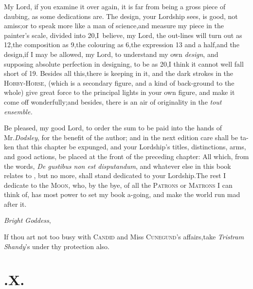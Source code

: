 \documentclass{article}
\begin{document}
My Lord, if you examine it over\break 
again, it is far from being a gross piece\break
of daubing, as some dedications are.\break
The design, your
Lordship sees, is good, 
not amiss;\tsk  or to speak more like a man of
science,\tsk  and measure my piece in the painter’s scale,
divided into 20,\tsk  I~believe, my Lord, the out-lines will turn
out as 12,\tsk  the composition as 9,\tsk  the colouring as
6,\tsk  the expression 13 and a half,\tsk  and the
design,\tsk  if I may be allowed, my Lord, to understand my own
\textit{design}, and supposing absolute perfection in designing, to
be as 20,\tsk  I think it cannot well fall short of 19. Besides
all this,\tsk  there is keeping in it, and the dark strokes in the
\textsc{Hobby-Horse}, (which is a secondary
figure, and a kind of back-ground to the whole) give great force to the
principal lights in your own figure, and make it come off
wonderfully;\tsk  and besides, there is an air of originality in
the \textit{tout ensemble.}

Be pleased, my good Lord, to order the sum to be paid into the
hands of Mr.\break\textit{Dodsley}, for the benefit of the author; and in
the next edition care shall be ta-\break ken that this chapter be expunged,
and your Lordship’s titles, distinctions, arms, and good
actions, be placed at the front of the preceding chapter: All
which, from the words, \textit{De gustibus non est disputandum}, and
whatever else in this book relates to
, but no more, shall
stand dedicated to your Lordship.\tsk\break  The rest I dedicate to the
\textsc{Moon}, who, by the bye, of all the \textsc{Patrons} or
\textsc{Matrons} I can think of, has most power to set my
book a-going, and make the world run mad after it.

\vskip-6pt

\textit{Bright Goddess},

\vskip-6pt

If thou art not too busy with \textsc{Candid} and Miss
\textsc{Cunegund}’s affairs,\tsk  take \textit{Tristram
Shandy}’s under thy protection also.

\vskip-6pt

\enlargethispage\baselineskip

\section{.\enspace X.}

\vskip-6pt
\end{document}
